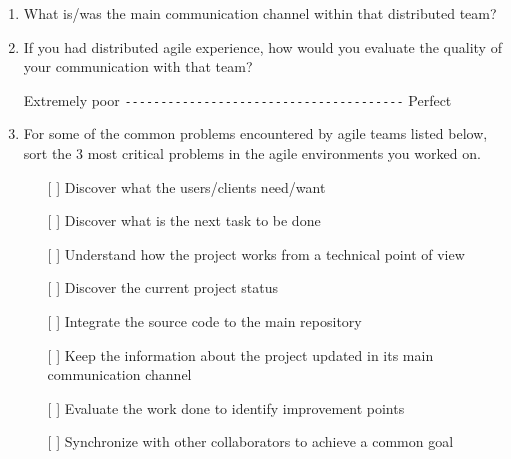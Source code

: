 \documentclass[lnbip]{svmultln}
\begin{document}
\begin{enumerate}
\item What is/was the main communication channel within
  that distributed team?
  \vspace{8pt}

\item If you had distributed agile experience, how would you evaluate
  the quality of your communication with that team?

  Extremely poor \verb=---------------------------------------=
  Perfect \vspace{8pt}

\item For some of the common problems encountered by agile teams
  listed below, sort the 3 most critical problems in the agile
  environments you worked on.
  \begin{itemize}
  \item[[ ] ] Discover what the users/clients need/want
  \item[[ ] ] Discover what is the next task to be done
  \item[[ ] ] Understand how the project works from a technical point
    of view
  \item[[ ] ] Discover the current project status
  \item[[ ] ] Integrate the source code to the main repository
  \item[[ ] ] Keep the information about the project updated in its
    main communication channel
  \item[[ ] ] Evaluate the work done to identify improvement points
  \item[[ ] ] Synchronize with other collaborators to achieve a common
    goal
  \end{itemize}
  \vspace{8pt}


\end{enumerate}
\end{document}

